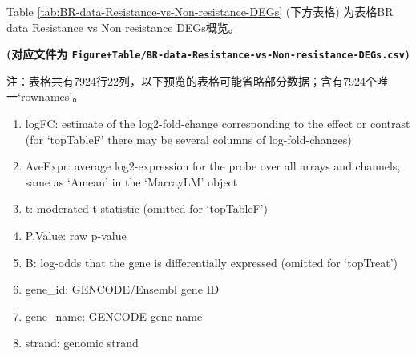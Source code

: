\documentclass[
]{article}
\providecommand{\tightlist}{%
  \setlength{\itemsep}{0pt}\setlength{\parskip}{0pt}}
\begin{document}
Table \ref{tab:BR-data-Resistance-vs-Non-resistance-DEGs} (下方表格) 为表格BR data Resistance vs Non resistance DEGs概览。

\textbf{(对应文件为 \texttt{Figure+Table/BR-data-Resistance-vs-Non-resistance-DEGs.csv})}

\begin{center}\begin{tcolorbox}[colback=gray!10, colframe=gray!50, width=0.9\linewidth, arc=1mm, boxrule=0.5pt]注：表格共有7924行22列，以下预览的表格可能省略部分数据；含有7924个唯一`rownames'。
\end{tcolorbox}
\end{center}
\begin{center}\begin{tcolorbox}[colback=gray!10, colframe=gray!50, width=0.9\linewidth, arc=1mm, boxrule=0.5pt]\begin{enumerate}\tightlist
\item logFC:  estimate of the log2-fold-change corresponding to the effect or contrast (for ‘topTableF’ there may be several columns of log-fold-changes)
\item AveExpr:  average log2-expression for the probe over all arrays and channels, same as ‘Amean’ in the ‘MarrayLM’ object
\item t:  moderated t-statistic (omitted for ‘topTableF’)
\item P.Value:  raw p-value
\item B:  log-odds that the gene is differentially expressed (omitted for ‘topTreat’)
\item gene\_id:  GENCODE/Ensembl gene ID
\item gene\_name:  GENCODE gene name
\item strand:  genomic strand
\end{enumerate}\end{tcolorbox}
\end{center}
\end{document}
